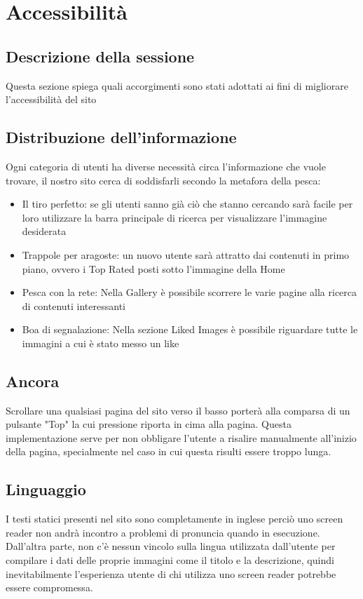 \documentclass[openany, a4paper, 12pt]{report}
\begin{document}
	\chapter{Accessibilità}
		\section{Descrizione della sessione}
		Questa sezione spiega quali accorgimenti sono stati adottati ai fini di migliorare l'accessibilità del sito
		\section{Distribuzione dell'informazione}
		Ogni categoria di utenti ha diverse necessità circa l'informazione che vuole trovare, il nostro sito cerca di soddisfarli secondo la metafora della pesca: 
		\begin{itemize}
					\item Il tiro perfetto: se gli utenti sanno già ciò che stanno cercando sarà facile per loro utilizzare la barra principale di ricerca per visualizzare l'immagine desiderata
					\item Trappole per aragoste: un nuovo utente sarà attratto dai contenuti in primo piano, ovvero i Top Rated posti sotto l'immagine della Home 
					\item Pesca con la rete: Nella Gallery è possibile scorrere le varie pagine alla ricerca di contenuti interessanti
					\item Boa di segnalazione: Nella sezione Liked Images è possibile riguardare tutte le immagini a cui è stato messo un like
		\end{itemize}
		\section{Ancora}
		Scrollare una qualsiasi pagina del sito verso il basso porterà alla comparsa di un pulsante "Top" la cui pressione riporta in cima alla pagina. Questa implementazione serve per non obbligare l'utente a risalire manualmente all'inizio della pagina, specialmente nel caso in cui questa risulti essere troppo lunga.
		\section{Linguaggio}
		I testi statici presenti nel sito sono completamente in inglese perciò uno screen reader non andrà incontro a problemi di pronuncia quando in esecuzione. Dall'altra parte, non c'è nessun vincolo sulla lingua utilizzata dall'utente per compilare i dati delle proprie immagini come il titolo e la descrizione, quindi inevitabilmente l'esperienza utente di chi utilizza uno screen reader potrebbe essere compromessa.
\end{document}
